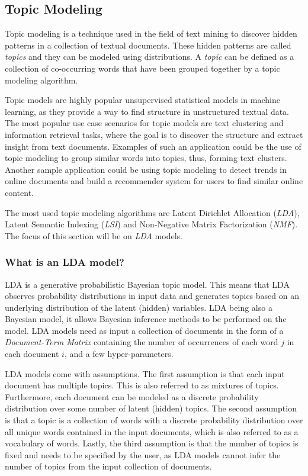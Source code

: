     \subsection{Topic Modeling\label{LDA_bestPractises}}
        
        Topic modeling is a technique used in the field of text mining to discover hidden patterns in a collection of textual documents. These hidden patterns are called \emph{topics} and they can be modeled using distributions. A \emph{topic} can be defined as a collection of co-occurring words that have been grouped together by a topic modeling algorithm.
        
        Topic models are highly popular unsupervised statistical models in machine learning, as they provide a way to find structure in unstructured textual data. The most popular use case scenarios for topic models are text clustering and information retrieval tasks, where the goal is to discover the structure and extract insight from text documents. Examples of such an application could be the use of topic modeling to group similar words into topics, thus, forming text clusters. Another sample application could be using topic modeling to detect trends in online documents and build a recommender system for users to find similar online content. 
        
        The most used topic modeling algorithms are Latent Dirichlet Allocation (\emph{LDA}), Latent Semantic Indexing (\emph{LSI}) and Non-Negative Matrix Factorization (\emph{NMF}). The focus of this section will be on \emph{LDA} models.
    
        \subsubsection{What is an LDA model?}
            
           LDA is a generative probabilistic Bayesian topic model. This means that LDA observes probability distributions in input data and generates topics based on an underlying distribution of the latent (hidden) variables. LDA being also a Bayesian model, it allows Bayesian inference methods to be performed on the model. LDA models need as input a collection of documents in the form of a \emph{Document-Term Matrix} containing the number of occurrences of each word $j$ in each document $i$, and a few hyper-parameters. 
           
           LDA models come with assumptions. The first assumption is that each input document has multiple topics. This is also referred to as mixtures of topics. Furthermore, each document can be modeled as a discrete probability distribution over some number of latent (hidden) topics. The second assumption is that a topic is a collection of words with a discrete probability distribution over all unique words contained in the input documents, which is also referred to as a vocabulary of words. Lastly, the third assumption is that the number of topics is fixed and needs to be specified by the user, as LDA models cannot infer the number of topics from the input collection of documents.
           
